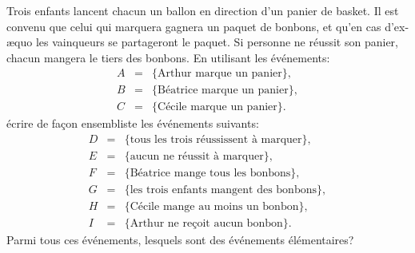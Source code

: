 \documentclass[a4paper,12pt,reqno]{amsart}
\begin{document}


\begin{exo}

  Trois enfants lancent chacun un ballon en direction d'un panier de basket. Il est convenu que celui qui marquera gagnera un paquet de bonbons, et qu'en cas d'ex-æquo les vainqueurs se partageront le paquet. Si personne ne réussit son panier, chacun mangera le tiers des bonbons. En utilisant les événements:
  \begin{eqnarray*}
    A & = & \{\text{Arthur marque un panier}\},\\
    B & = & \{\text{Béatrice marque un panier}\},\\
    C & = & \{\text{Cécile marque un panier}\}.
  \end{eqnarray*}
  écrire de façon ensembliste les événements suivants:
  \begin{eqnarray*}
    D & = & \{\text{tous les trois réussissent à marquer}\},\\
    E & = & \{\text{aucun ne réussit à marquer}\},\\
    F & = & \{\text{Béatrice mange tous les bonbons}\},\\
    G & = & \{\text{les trois enfants mangent des bonbons}\},\\
    H & = & \{\text{Cécile mange au moins un bonbon}\},\\
    I & = & \{\text{Arthur ne reçoit aucun bonbon}\}.
  \end{eqnarray*}
  Parmi tous ces événements, lesquels sont des événements élémentaires?

\end{exo}
\end{document}
